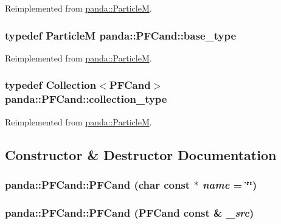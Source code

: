Reimplemented from \hyperlink{classpanda_1_1ParticleM_a1ba36e35f5cd6a26decfbaa815678d2a}{panda::ParticleM}.\hypertarget{classpanda_1_1PFCand_a2c9c280056db9b280276ec15926e7043}{
\subsubsection[{base\_\-type}]{\setlength{\rightskip}{0pt plus 5cm}typedef {\bf ParticleM} {\bf panda::PFCand::base\_\-type}}}
\label{classpanda_1_1PFCand_a2c9c280056db9b280276ec15926e7043}


Reimplemented from \hyperlink{classpanda_1_1ParticleM_a134d640b78531bc47ddb19ba490de07d}{panda::ParticleM}.\hypertarget{classpanda_1_1PFCand_a6f3fdf6ad51952f9995adb1111fec3bc}{
\subsubsection[{collection\_\-type}]{\setlength{\rightskip}{0pt plus 5cm}typedef {\bf Collection}$<${\bf PFCand}$>$ {\bf panda::PFCand::collection\_\-type}}}
\label{classpanda_1_1PFCand_a6f3fdf6ad51952f9995adb1111fec3bc}


Reimplemented from \hyperlink{classpanda_1_1ParticleM_ae39fbe234c21960d067e8790541d0d68}{panda::ParticleM}.

\subsection{Constructor \& Destructor Documentation}
\hypertarget{classpanda_1_1PFCand_ae935e8e606a122baaeefa1ec62f16325}{
\subsubsection[{PFCand}]{\setlength{\rightskip}{0pt plus 5cm}panda::PFCand::PFCand (char const $\ast$ {\em name} = {\ttfamily \char`\"{}\char`\"{}})}}
\label{classpanda_1_1PFCand_ae935e8e606a122baaeefa1ec62f16325}
\hypertarget{classpanda_1_1PFCand_a3ffef86621fd1e30c54ca4435f692a8d}{
\subsubsection[{PFCand}]{\setlength{\rightskip}{0pt plus 5cm}panda::PFCand::PFCand ({\bf PFCand} const \& {\em \_\-src})}}
\label{classpanda_1_1PFCand_a3ffef86621fd1e30c54ca4435f692a8d}


